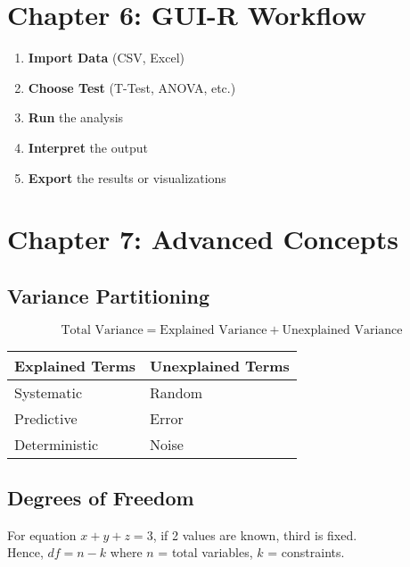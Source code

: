 \documentclass[
  letterpaper,
  DIV=11,
  numbers=noendperiod]{scrreprt}
\providecommand{\tightlist}{%
  \setlength{\itemsep}{0pt}\setlength{\parskip}{0pt}}
\begin{document}
\section{Chapter 6: GUI-R Workflow}\label{chapter-6-gui-r-workflow}

\begin{enumerate}
\def\labelenumi{\arabic{enumi}.}
\tightlist
\item
  \textbf{Import Data} (CSV, Excel)\\
\item
  \textbf{Choose Test} (T-Test, ANOVA, etc.)\\
\item
  \textbf{Run} the analysis\\
\item
  \textbf{Interpret} the output\\
\item
  \textbf{Export} the results or visualizations
\end{enumerate}

\section{Chapter 7: Advanced
Concepts}\label{chapter-7-advanced-concepts}

\subsection{Variance Partitioning}\label{variance-partitioning}

\[
\text{Total Variance} = \text{Explained Variance} + \text{Unexplained Variance}
\]

\begin{longtable}[]{@{}ll@{}}
\toprule\noalign{}
Explained Terms & Unexplained Terms \\
\midrule\noalign{}
\endhead
\bottomrule\noalign{}
\endlastfoot
Systematic & Random \\
Predictive & Error \\
Deterministic & Noise \\
\end{longtable}

\subsection{Degrees of Freedom}\label{degrees-of-freedom-1}

For equation \(x + y + z = 3\), if 2 values are known, third is fixed.\\
Hence, \(df = n - k\) where \(n\) = total variables, \(k\) =
constraints.
\end{document}

